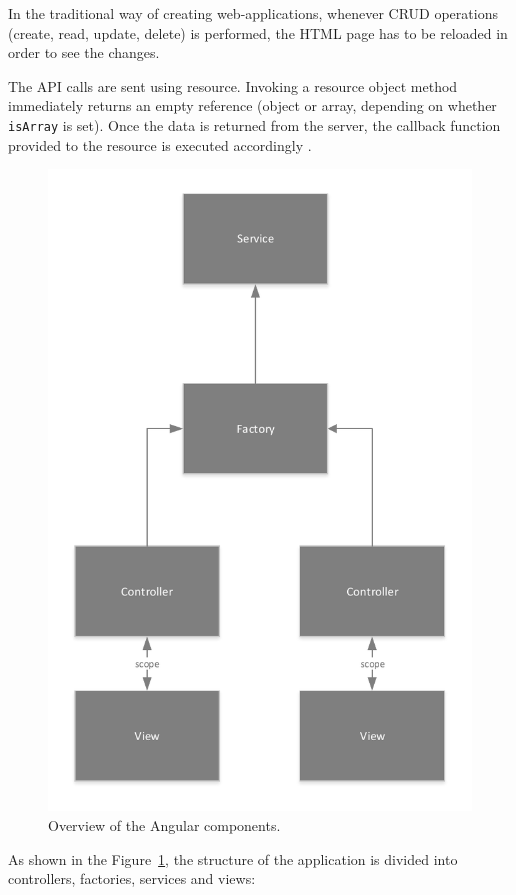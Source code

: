 In the traditional way of creating web-applications, whenever CRUD operations (create, read, update, delete) is performed, the HTML page has to be reloaded in order to see the changes. 

The API calls are sent using \textdollar resource. Invoking a \textdollar resource object method immediately returns an empty reference (object or array, depending on whether \texttt{isArray} is set). Once the data is returned from the server, the callback function provided to the resource is executed accordingly \cite{Angul96online}.

\begin{figure}[h]
  \centering
  \includegraphics[width=.5\textwidth]{figures/AngularComponents.pdf}
  \caption[Angular components.]{Overview of the Angular components.}
  \label{fig:angularComponents}
\end{figure}

As shown in the Figure~\ref{fig:angularComponents}, the structure of the application is divided into controllers, factories, services and views: 

